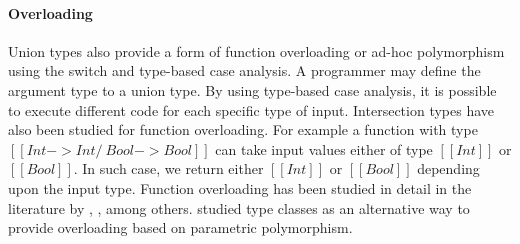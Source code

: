 \paragraph{Overloading}
Union types also provide a form of function overloading or ad-hoc
polymorphism using the switch and type-based case analysis. A programmer
may define the argument type to a union type. By
using type-based case analysis, it is possible to execute different code
for each specific type of input.  Intersection types have also been
studied for function overloading. For example a function with type
$[[Int -> Int /\ Bool -> Bool]]$ can take input values either of type
$[[Int]]$ or $[[Bool]]$.  In such case, we return either $[[Int]]$ or $[[Bool]]$
depending upon the input type.  Function overloading has been studied
in detail in the literature by \cite{castagna1995calculus},
\cite{cardelli1985understanding}, \cite{stuckey2005theory} among
others.  \citet{wadler1989make} studied type classes as an alternative way
to provide overloading based on parametric polymorphism.

